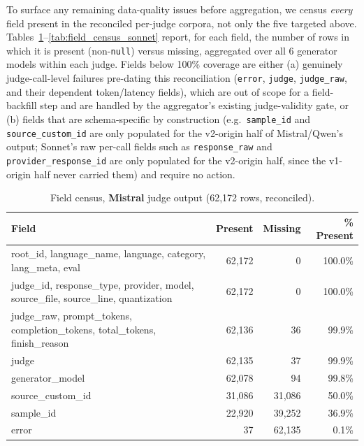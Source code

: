 To surface any remaining data-quality issues before aggregation, we census
\emph{every} field present in the reconciled per-judge corpora, not only the
five targeted above. Tables~\ref{tab:field_census_mistral}--\ref{tab:field_census_sonnet}
report, for each field, the number of rows in which it is present
(non-\texttt{null}) versus missing, aggregated over all 6 generator models
within each judge. Fields below 100\% coverage are either (a) genuinely
judge-call-level failures pre-dating this reconciliation (\texttt{error},
\texttt{judge}, \texttt{judge\_raw}, and their dependent token/latency
fields), which are out of scope for a field-backfill step and are handled by
the aggregator's existing judge-validity gate, or (b) fields that are
schema-specific by construction (e.g.\ \texttt{sample\_id} and
\texttt{source\_custom\_id} are only populated for the v2-origin half of
Mistral/Qwen's output; Sonnet's raw per-call fields such as
\texttt{response\_raw} and \texttt{provider\_response\_id} are only populated
for the v2-origin half, since the v1-origin half never carried them) and
require no action.

\begin{table}[t]
\centering
\small
\caption{Field census, \textbf{Mistral} judge output (62{,}172 rows, reconciled).}
\label{tab:field_census_mistral}
\begin{tabular}{lrrr}
\toprule
\textbf{Field} & \textbf{Present} & \textbf{Missing} & \textbf{\% Present} \\
\midrule
root\_id, language\_name, language, category, lang\_meta, eval & 62{,}172 & 0 & 100.0\% \\
judge\_id, response\_type, provider, model, source\_file, source\_line, quantization & 62{,}172 & 0 & 100.0\% \\
judge\_raw, prompt\_tokens, completion\_tokens, total\_tokens, finish\_reason & 62{,}136 & 36 & 99.9\% \\
judge & 62{,}135 & 37 & 99.9\% \\
generator\_model & 62{,}078 & 94 & 99.8\% \\
source\_custom\_id & 31{,}086 & 31{,}086 & 50.0\% \\
sample\_id & 22{,}920 & 39{,}252 & 36.9\% \\
error & 37 & 62{,}135 & 0.1\% \\
\bottomrule
\end{tabular}
\end{table}

